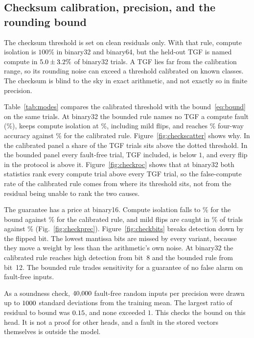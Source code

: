 \documentclass{ieeeaccess}
\begin{document}
\subsection{Checksum calibration, precision, and the rounding bound}
\label{sec:bounded}

The checksum threshold is set on clean residuals only. With that rule, compute isolation is $100\%$ in binary32 and binary64, but the held-out TGF is named compute in $5.0\pm3.2\%$ of binary32 trials. A TGF lies far from the calibration range, so its rounding noise can exceed a threshold calibrated on known classes. The checksum is blind to the sky in exact arithmetic, and not exactly so in finite precision.

Table~\ref{tab:modes} compares the calibrated threshold with the bound~\eqref{eq:bound} on the same trials. At binary32 the bounded rule names no TGF a compute fault (\BndNovCompThirtyTwo\%), keeps compute isolation at \BndCompThirtyTwo\%, including mild flips, and reaches \BndAccThirtyTwo\% four-way accuracy against \CalAccThirtyTwo\% for the calibrated rule. Figure~\ref{fig:checkscatter} shows why. In the calibrated panel a share of the TGF trials sits above the dotted threshold. In the bounded panel every fault-free trial, TGF included, is below $1$, and every flip in the protocol is above it. Figure~\ref{fig:checkroc} shows that at binary32 both statistics rank every compute trial above every TGF trial, so the false-compute rate of the calibrated rule comes from where its threshold sits, not from the residual being unable to rank the two causes.

The guarantee has a price at binary16. Compute isolation falls to \BndCompSixteen\% for the bound against \CalCompSixteen\% for the calibrated rule, and mild flips are caught in \BndMildSixteen\% of trials against \CalMildSixteen\% (Fig.~\ref{fig:checkprec}). Figure~\ref{fig:checkbits} breaks detection down by the flipped bit. The lowest mantissa bits are missed by every variant, because they move a weight by less than the arithmetic's own noise. At binary32 the calibrated rule reaches high detection from bit~8 and the bounded rule from bit~12. The bounded rule trades sensitivity for a guarantee of no false alarm on fault-free inputs.

As a soundness check, $40{,}000$ fault-free random inputs per precision were drawn up to $1000$ standard deviations from the training mean. The largest ratio of residual to bound was $0.15$, and none exceeded $1$. This checks the bound on this head. It is not a proof for other heads, and a fault in the stored vectors themselves is outside the model.
\end{document}
